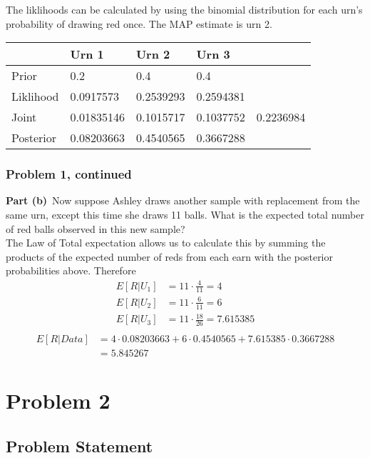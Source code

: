 \documentclass[12pt]{article}
\theoremstyle{definition}
\begin{document}
The liklihoods can be calculated by using the binomial distribution for each urn's probability of drawing red once. The MAP estimate is urn 2.\\

\begin{tabular}{lllll}
          & Urn 1      & Urn 2     & Urn 3     &           \\
\hline
Prior     & 0.2        & 0.4       & 0.4       &           \\
Liklihood & 0.0917573  & 0.2539293 & 0.2594381 &           \\
Joint     & 0.01835146 & 0.1015717 & 0.1037752 & 0.2236984 \\
Posterior & 0.08203663 & 0.4540565 & 0.3667288 &          \\
\hline
\end{tabular}


\newpage
\subsubsection*{Problem 1, continued}

\noindent
{\bf Part (b)}\ Now suppose Ashley draws another sample with replacement from the same urn, except this time she draws 11 balls. What is the expected total number of red balls observed in this new sample?\\

The Law of Total expectation allows us to calculate this by summing the products of the expected number of reds from each earn with the posterior probabilities above. Therefore
\begin{align*}
E[R|U_1] &= 11\cdot \frac{4}{11} = 4\\
E[R|U_2] &= 11\cdot \frac{6}{11} = 6\\
E[R|U_3] &= 11\cdot \frac{18}{26} = 7.615385\\
\end{align*}
\begin{align*}
E[R|Data] &= 4 \cdot 0.08203663 + 6 \cdot 0.4540565 + 7.615385 \cdot 0.3667288\\
&= 5.845267
\end{align*}

\newpage
\section*{Problem 2}

\subsection*{Problem Statement}
\end{document}
